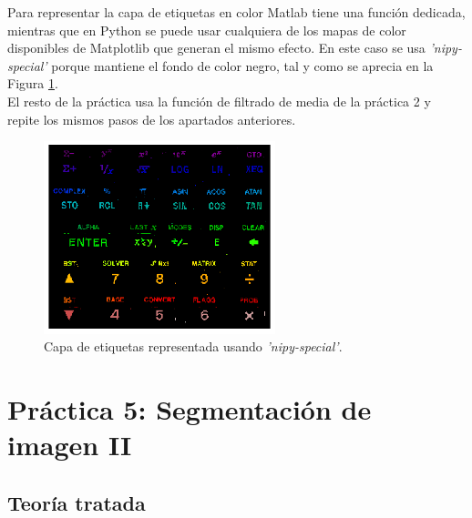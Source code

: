 Para representar la capa de etiquetas en color Matlab tiene una función dedicada, mientras que en Python se puede usar cualquiera de los mapas de color disponibles de Matplotlib que generan el mismo efecto. En este caso se usa \emph{'nipy-special'} porque mantiene el fondo de color negro, tal y como se aprecia en la Figura \ref{color}.\\

El resto de la práctica usa la función de filtrado de media de la práctica 2 y repite los mismos pasos de los apartados anteriores.

\begin{figure}[h]
\centering
\includegraphics[width=0.6\textwidth]{imagenes/color}
\caption{Capa de etiquetas representada usando \emph{'nipy-special'}.}
\label{color}
\end{figure}


\section{ Práctica 5: Segmentación de imagen II}
\subsection{Teoría tratada}

